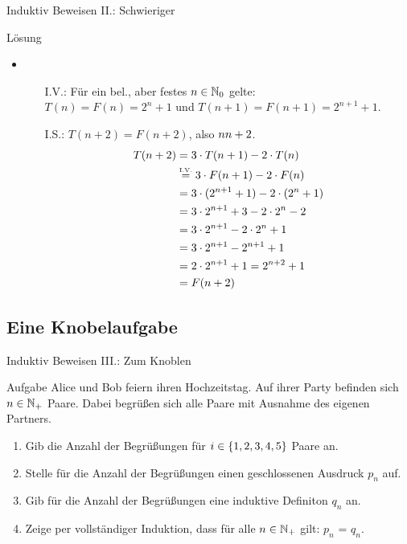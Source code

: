 \begin{frame}{Induktiv Beweisen II.: Schwieriger}
	\begin{block}{Lösung}
	\begin{itemize}
		\item 
		\begin{itemize}
				\item[I.V.:] Für ein bel., aber festes $n \in \mathbb{N}_0$ gelte: \\
				 $T(n)=F(n)=2^n+1$ und $T(n+1)=F(n+1)=2^{n+1}+1$.
				\item[I.S.:] \zz $T(n+2) = F(n+2)$, also $n \notStephan{\leadsto} \Stephan{\curvearrowright} n+2$.
				\begin{align*}
					T(n+2) &= 3 \cdot T(n+1) - 2 \cdot T(n) \\
						   &\eqtext{I.V.} 3 \cdot F(n+1) - 2 \cdot F(n) \\
						   &= 3 \cdot (2^{n+1}+1) - 2 \cdot (2^n+1) \\
						   &= 3 \cdot 2^{n+1} + 3 - 2 \cdot 2^n - 2 \\
						   &= 3 \cdot 2^{n+1} - 2 \cdot 2^n + 1 \\
						   &= 3 \cdot 2^{n+1} - 2^{n+1} +1 \\
						   &= 2 \cdot 2^{n+1} + 1 = 2^{n+2} + 1 \\
						   &=F(n+2)
				\end{align*}
			\end{itemize}
	\end{itemize}
	\end{block}
\end{frame}
\subsection{Eine Knobelaufgabe}
\begin{frame}{Induktiv Beweisen III.: Zum Knoblen}
	\begin{exampleblock}{Aufgabe}
		Alice und Bob feiern ihren Hochzeitstag. Auf ihrer Party befinden sich $n \in \mathbb{N}_+$ Paare. Dabei begrüßen sich alle Paare mit Ausnahme des eigenen Partners.\\
		\begin{enumerate}
			\item Gib die Anzahl der Begrüßungen für $i \in \{ 1,2,3,4,5 \}$ Paare an.
			\item Stelle für die Anzahl der Begrüßungen einen geschlossenen Ausdruck $p_n$ auf.
			\item Gib für die Anzahl der Begrüßungen eine induktive Definiton $q_n$ an.
			\item Zeige per vollständiger Induktion, dass für alle $n \in \mathbb{N}_+$ gilt: $p_n$ = $q_n$.
		\end{enumerate}
	\end{exampleblock}
\end{frame}

